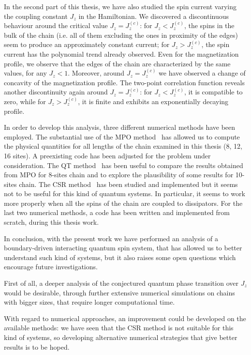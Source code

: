 In the second part of this thesis, we have also studied the spin current varying the coupling constant $J_z$ in the Hamiltonian. We discovered a discontinuous behaviour around the critical value $J_z = J_z^{(c)}$: for $J_z < J_z^{(c)}$, %
the spins in the bulk of the chain (i.e. all of them excluding the ones in proximity of the edges) seem to produce an approximately constant current; for $J_z > J_z^{(c)}$, the spin current has the polynomial trend already observed. Even for the magnetization profile, we observe that the edges of the chain are characterized by the same values, for any $J_z<1$. Moreover, around $J_z = J_z^{(c)}$ we have observed a change of concavity of the magnetization profile. The two-point correlation function reveals another discontinuity again around $J_z = J_z^{(c)}$: for $J_z < J_z^{(c)}$, it is compatible to zero, while for $J_z > J_z^{(c)}$, it is finite and exhibits an exponentially decaying profile.

In order to develop this analysis, three different numerical methods have been employed.  The substantial use of the MPO method~\cite{MPO_method} has allowed us to compute the physical quantities for all lengths of the chain examined in this thesis (8, 12, 16 sites). A preexisting code has been adjusted for the problem under consideration. The QT method~\cite{PhysRevLett.68.580} has been useful to compare the results obtained from MPO for 8-sites chain and to explore the plausibility of some results for 10-sites chain. The CSR method~\cite{PhysRevLett.115.080604} has been studied and implemented but it seems not to be useful for this kind of quantum systems. In particular, it seems to work more properly when all the spins of the chain are coupled to dissipators. For the last two numerical methods, a code has been written and implemented from scratch, during this thesis work.

In conclusion, with the present work we have performed an analysis of a boundary-driven interacting quantum spin system, that
has allowed us to better understand such kind of systems, but it also raises some open questions which encourage future investigations.

First of all, a deeper analysis of the conjectured quantum phase transition over $J_z$ would be desirable, through further extensive numerical simulations on chains with bigger sizes, that require longer computational time.

With regard to numerical approaches, an improvement could be developed on the available methods: we have seen that the CSR method is not suitable for this kind of systems, so developing alternative numerical strategies that give better results is to be hoped.

